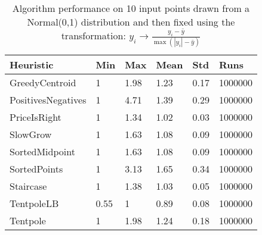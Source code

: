 \begin{table*} \centering
\begin{tabular}{|l|lllll|}
\hline
Heuristic & Min & Max & Mean & Std & Runs \\ \hline
GreedyCentroid& 1& 1.98& 1.23& 0.17& 1000000\\ 
PositivesNegatives& 1& 4.71& 1.39& 0.29& 1000000\\ 
PriceIsRight& 1& 1.34& 1.02& 0.03& 1000000\\ 
SlowGrow& 1& 1.63& 1.08& 0.09& 1000000\\ 
SortedMidpoint& 1& 1.63& 1.08& 0.09& 1000000\\ 
SortedPoints& 1& 3.13& 1.65& 0.34& 1000000\\ 
Staircase& 1& 1.38& 1.03& 0.05& 1000000\\ 
TentpoleLB& 0.55& 1& 0.89& 0.08& 1000000\\ 
Tentpole& 1& 1.98& 1.24& 0.18& 1000000\\ 
\hline
\end{tabular}
\caption{Algorithm performance on 10 input points drawn from a Normal(0,1) distribution and then fixed using the transformation: $y_i \rightarrow \frac{y_i - \bar{y} }{\max(|y_i| - \bar{y}) }$ }
\label{table:uniformResults}
\end{table*}


